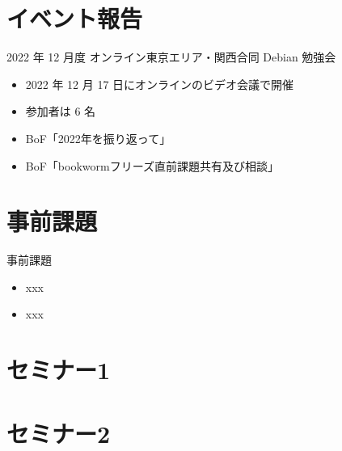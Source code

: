 \section{イベント報告}

\begin{frame}{2022 年 12 月度 オンライン東京エリア・関西合同 Debian 勉強会}
\begin{itemize}
\item 2022 年 12 月 17 日にオンラインのビデオ会議で開催
\item 参加者は 6 名
\item BoF「2022年を振り返って」
\item BoF「bookwormフリーズ直前課題共有及び相談」
\end{itemize}
\end{frame}


\section{事前課題}


\begin{frame}{事前課題}
  \begin{itemize}
  \item xxx
  \item xxx
  \end{itemize}
\end{frame}

{\footnotesize
 
}

%

\section{セミナー1}

\section{セミナー2}



